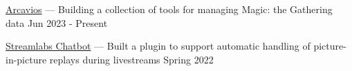 \href{https://github.com/arcavios}{Arcavios} --- Building a collection of tools for managing Magic: the Gathering data  \hfill Jun 2023 - Present

\href{https://github.com/iambroadband/auto-instant-replay}{Streamlabs Chatbot} --- Built a plugin to support automatic handling of picture-in-picture replays during livestreams    \hfill Spring 2022
